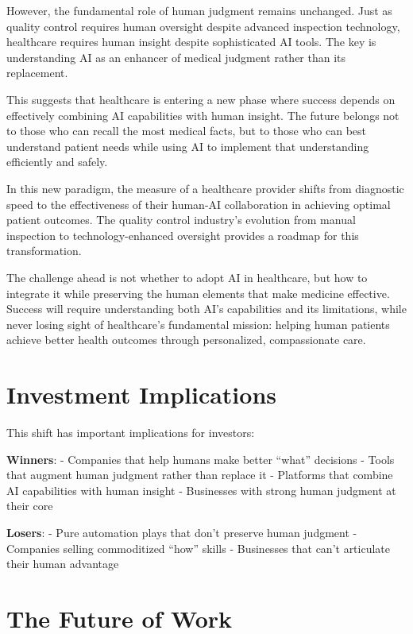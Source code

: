 \documentclass[
  Letterpaper,
]{scrbook}
\begin{document}
However, the fundamental role of human judgment remains unchanged. Just
as quality control requires human oversight despite advanced inspection
technology, healthcare requires human insight despite sophisticated AI
tools. The key is understanding AI as an enhancer of medical judgment
rather than its replacement.

This suggests that healthcare is entering a new phase where success
depends on effectively combining AI capabilities with human insight. The
future belongs not to those who can recall the most medical facts, but
to those who can best understand patient needs while using AI to
implement that understanding efficiently and safely.

In this new paradigm, the measure of a healthcare provider shifts from
diagnostic speed to the effectiveness of their human-AI collaboration in
achieving optimal patient outcomes. The quality control industry's
evolution from manual inspection to technology-enhanced oversight
provides a roadmap for this transformation.

The challenge ahead is not whether to adopt AI in healthcare, but how to
integrate it while preserving the human elements that make medicine
effective. Success will require understanding both AI's capabilities and
its limitations, while never losing sight of healthcare's fundamental
mission: helping human patients achieve better health outcomes through
personalized, compassionate care.

\section{Investment Implications}\label{investment-implications-1}

This shift has important implications for investors:

\textbf{Winners}: - Companies that help humans make better ``what''
decisions - Tools that augment human judgment rather than replace it -
Platforms that combine AI capabilities with human insight - Businesses
with strong human judgment at their core

\textbf{Losers}: - Pure automation plays that don't preserve human
judgment - Companies selling commoditized ``how'' skills - Businesses
that can't articulate their human advantage

\section{The Future of Work}\label{the-future-of-work}
\end{document}
